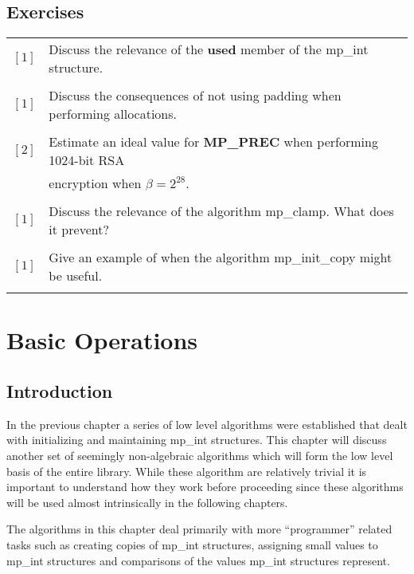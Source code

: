 \documentclass[b5paper]{book}
\begin{document}
\section*{Exercises}
\begin{tabular}{cl}
$\left [ 1 \right ]$ & Discuss the relevance of the \textbf{used} member of the mp\_int structure. \\
                     & \\
$\left [ 1 \right ]$ & Discuss the consequences of not using padding when performing allocations.  \\
                     & \\
$\left [ 2 \right ]$ & Estimate an ideal value for \textbf{MP\_PREC} when performing 1024-bit RSA \\
                     & encryption when $\beta = 2^{28}$.  \\
                     & \\
$\left [ 1 \right ]$ & Discuss the relevance of the algorithm mp\_clamp.  What does it prevent? \\
                     & \\
$\left [ 1 \right ]$ & Give an example of when the algorithm  mp\_init\_copy might be useful. \\
                     & \\
\end{tabular}



\chapter{Basic Operations}

\section{Introduction}
In the previous chapter a series of low level algorithms were established that dealt with initializing and maintaining
mp\_int structures.  This chapter will discuss another set of seemingly non-algebraic algorithms which will form the low 
level basis of the entire library.  While these algorithm are relatively trivial it is important to understand how they
work before proceeding since these algorithms will be used almost intrinsically in the following chapters.

The algorithms in this chapter deal primarily with more ``programmer'' related tasks such as creating copies of
mp\_int structures, assigning small values to mp\_int structures and comparisons of the values mp\_int structures
represent.   
\end{document}
